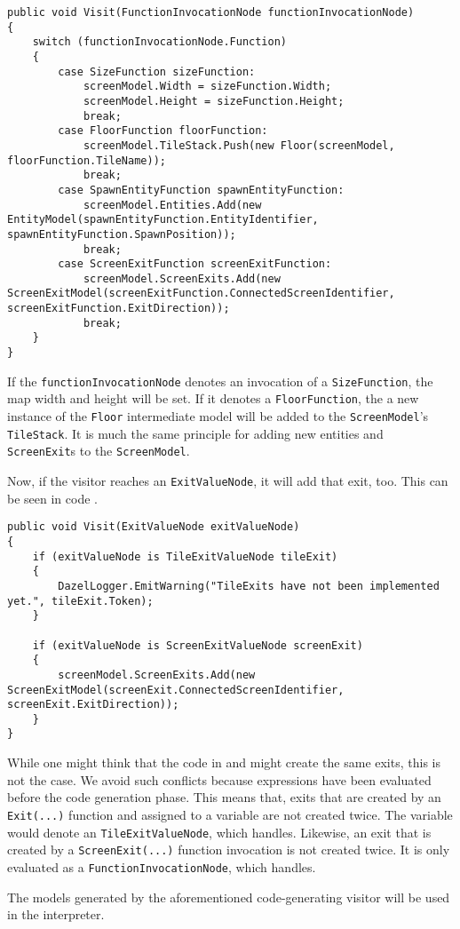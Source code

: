\begin{lstlisting}[language=CSharp, caption={FunctionInvocationNode Visit method}, label={lst:finVisitSG}]
public void Visit(FunctionInvocationNode functionInvocationNode)
{
    switch (functionInvocationNode.Function)
    {
        case SizeFunction sizeFunction:
            screenModel.Width = sizeFunction.Width;
            screenModel.Height = sizeFunction.Height;
            break;
        case FloorFunction floorFunction:
            screenModel.TileStack.Push(new Floor(screenModel, floorFunction.TileName));
            break;
        case SpawnEntityFunction spawnEntityFunction:
            screenModel.Entities.Add(new EntityModel(spawnEntityFunction.EntityIdentifier, spawnEntityFunction.SpawnPosition));
            break;
        case ScreenExitFunction screenExitFunction:
            screenModel.ScreenExits.Add(new ScreenExitModel(screenExitFunction.ConnectedScreenIdentifier, screenExitFunction.ExitDirection));
            break;
    }
}    
\end{lstlisting}

If the \texttt{functionInvocationNode} denotes an invocation of a \texttt{SizeFunction}, the map width and height will be set. If it denotes a \texttt{FloorFunction}, the a new instance of the \texttt{Floor} intermediate model will be added to the \texttt{ScreenModel}'s \texttt{TileStack}. It is much the same principle for adding new entities and \texttt{ScreenExit}s to the \texttt{ScreenModel}.

Now, if the visitor reaches an \texttt{ExitValueNode}, it will add that exit, too. This can be seen in code .

\begin{lstlisting}[label={lst:visitExitNodeSG}, caption={Visit \texttt{ExitValueNode}}, language=CSharp]
public void Visit(ExitValueNode exitValueNode)
{
    if (exitValueNode is TileExitValueNode tileExit)
    {
        DazelLogger.EmitWarning("TileExits have not been implemented yet.", tileExit.Token);
    }

    if (exitValueNode is ScreenExitValueNode screenExit)
    {
        screenModel.ScreenExits.Add(new ScreenExitModel(screenExit.ConnectedScreenIdentifier, screenExit.ExitDirection));
    }
}
\end{lstlisting}

While one might think that the code in  and  might create the same exits, this is not the case. We avoid such conflicts because expressions have been evaluated before the code generation phase. This means that, exits that are created by an \texttt{Exit(...)} function and assigned to a variable are not created twice. The variable would denote an \texttt{TileExitValueNode}, which  handles. Likewise, an exit that is created by a \texttt{ScreenExit(...)} function invocation is not created twice. It is only evaluated as a \texttt{FunctionInvocationNode}, which  handles.


The models generated by the aforementioned code-generating visitor will be used in the \dazel{} interpreter.